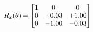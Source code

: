 \documentclass[preview]{standalone}
\begin{document}
\begin{align*}
\special{dvisvgm:raw <g id='unique000'>}R_{x}(\theta) = \begin{bmatrix}1 & 0 & 0 \\0 & -0.03 & +1.00 \\0 & -1.00 & -0.03\end{bmatrix}\special{dvisvgm:raw </g>}
\end{align*}
\end{document}
